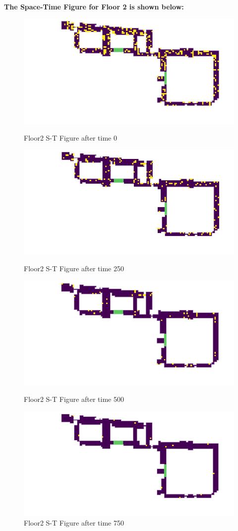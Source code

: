 \documentclass{mcmthesis}
\begin{document}
\noindent\textbf{The Space-Time Figure for Floor 2 is shown below:}
\begin{figure}[ht]
\parbox[b]{.5\textwidth}{
\includegraphics[scale=0.7]{2-1}
\centering\captionsetup{font=small, labelfont=bf}\caption{Floor2 S-T Figure after time 0}
}
\parbox[b]{.5\textwidth}{
\includegraphics[scale=0.7]{2-2}
\centering\captionsetup{font=small, labelfont=bf}\caption{Floor2 S-T Figure after time 250}
}
\parbox[b]{.5\textwidth}{
\includegraphics[scale=0.7]{2-3}
\centering\captionsetup{font=small, labelfont=bf}\caption{Floor2 S-T Figure after time 500}
}
\parbox[b]{.5\textwidth}{
\includegraphics[scale=0.7]{2-4}
\centering\captionsetup{font=small, labelfont=bf}\caption{Floor2 S-T Figure after time 750}
}
\end{figure}
\end{document}
